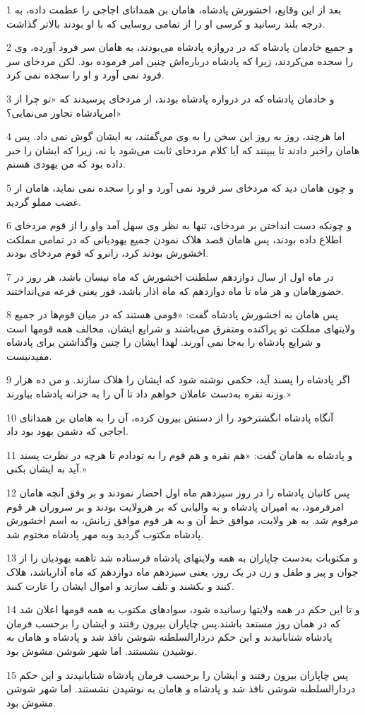 \par 1 بعد از این وقایع، اخشورش پادشاه، هامان بن همداتای اجاجی را عظمت داده، به درجه بلند رسانید و کرسی او را از تمامی روسایی که با او بودند بالاتر گذاشت.
\par 2 و جمیع خادمان پادشاه که در دروازه پادشاه می‌بودند، به هامان سر فرود آورده، وی را سجده می‌کردند، زیرا که پادشاه درباره‌اش چنین امر فرموده بود. لکن مردخای سر فرود نمی آورد و او را سجده نمی کرد.
\par 3 و خادمان پادشاه که در دروازه پادشاه بودند، از مردخای پرسیدند که «تو چرا از امرپادشاه تجاوز می‌نمایی؟»
\par 4 اما هر‌چند، روز به روز این سخن را به وی می‌گفتند، به ایشان گوش نمی داد. پس هامان راخبر دادند تا ببینند که آیا کلام مردخای ثابت می‌شود یا نه، زیرا که ایشان را خبر داده بود که من یهودی هستم.
\par 5 و چون هامان دید که مردخای سر فرود نمی آورد و او را سجده نمی نماید، هامان از غضب مملو گردید.
\par 6 و چونکه دست انداختن بر مردخای، تنها به نظر وی سهل آمد واو را از قوم مردخای اطلاع داده بودند، پس هامان قصد هلاک نمودن جمیع یهودیانی که در تمامی مملکت اخشورش بودند کرد، زانرو که قوم مردخای بودند.
\par 7 در ماه اول از سال دوازدهم سلطنت اخشورش که ماه نیسان باشد، هر روز در حضورهامان و هر ماه تا ماه دوازدهم که ماه اذار باشد، فور یعنی قرعه می‌انداختند.
\par 8 پس هامان به اخشورش پادشاه گفت: «قومی هستند که در میان قوم‌ها در جمیع ولایتهای مملکت تو پراکنده ومتفرق می‌باشند و شرایع ایشان، مخالف همه قومها است و شرایع پادشاه را به‌جا نمی آورند. لهذا ایشان را چنین واگذاشتن برای پادشاه مفیدنیست.
\par 9 اگر پادشاه را پسند آید، حکمی نوشته شود که ایشان را هلاک سازند. و من ده هزار وزنه نقره به‌دست عاملان خواهم داد تا آن را به خزانه پادشاه بیاورند.»
\par 10 آنگاه پادشاه انگشترخود را از دستش بیرون کرده، آن را به هامان بن همداتای اجاجی که دشمن یهود بود داد.
\par 11 و پادشاه به هامان گفت: «هم نقره و هم قوم را به تودادم تا هرچه در نظرت پسند آید به ایشان بکنی.»
\par 12 پس کاتبان پادشاه را در روز سیزدهم ماه اول احضار نمودند و بر وفق آنچه هامان امرفرمود، به امیران پادشاه و به والیانی که بر هرولایت بودند و بر سروران هر قوم مرقوم شد. به هر ولایت، موافق خط آن و به هر قوم موافق زبانش، به اسم اخشورش پادشاه مکتوب گردید وبه مهر پادشاه مختوم شد.
\par 13 و مکتوبات به‌دست چاپاران به همه ولایتهای پادشاه فرستاده شد تاهمه یهودیان را از جوان و پیر و طفل و زن در یک روز، یعنی سیزدهم ماه دوازدهم که ماه آذارباشد، هلاک کنند و بکشند و تلف سازند و اموال ایشان را غارت کنند.
\par 14 و تا این حکم در همه ولایتها رسانیده شود، سوادهای مکتوب به همه قومها اعلان شد که در همان روز مستعد باشند.پس چاپاران بیرون رفتند و ایشان را برحسب فرمان پادشاه شتابانیدند و این حکم دردارالسلطنه شوشن نافذ شد و پادشاه و هامان به نوشیدن نشستند. اما شهر شوشن مشوش بود.
\par 15 پس چاپاران بیرون رفتند و ایشان را برحسب فرمان پادشاه شتابانیدند و این حکم دردارالسلطنه شوشن نافذ شد و پادشاه و هامان به نوشیدن نشستند. اما شهر شوشن مشوش بود.
 
